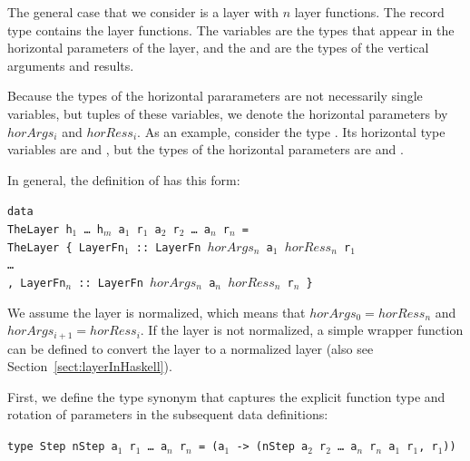 \documentclass[preprint,natbib]{sigplanconf}
\begin{document}


The general case that we consider is a layer with $n$ layer functions. The record type  contains the layer functions. The  variables are the types that appear in the horizontal parameters of the layer, and the  and  are the types of the vertical arguments and results. 

Because the types of the horizontal pararameters are not necessarily single  variables, but tuples of these variables, we denote the horizontal parameters by $horArgs_i$ and $horRess_i$. As an example, consider the type . Its horizontal  type variables are  and , but the types of the horizontal parameters are  and . 

In general, the definition of  has this form:
\
\begin{small}
\begin{tabbing}
{\tt da}\={\tt ta}\\
\> {\tt Th}\={\tt eLayer h$_1$ \dots ~h$_m$ a$_1$ r$_1$ a$_2$ r$_2$ \dots ~a$_n$ r$_n$ = }\\
\> \> {\tt TheLayer~}\={\tt \{~LayerFn$_1$}\verb| :: |{\tt LayerFn $horArgs_n$ a$_1$ $horRess_n$ r$_1$}\\
\>\>\> {\tt \dots }\\
\>\>\> {\tt , LayerFn$_n$}\verb| :: |{\tt LayerFn $horArgs_n$ a$_n$ $horRess_n$ r$_n$ \}}\\
\end{tabbing}
\end{small}

We assume the layer is normalized, which means that $horArgs_{0} = horRess_n$ and 
$horArgs_{i+1} = horRess_i$. If the layer is not normalized, a simple wrapper function can be defined to convert the layer to a normalized layer (also see Section~\ref{sect:layerInHaskell}).

\head{Type definitions}

\bc
First, we define the \p{Step} type synonym that captures the explicit function type and rotation of parameters in the subsequent data definitions:

\begin{small}
\begin{tabbing}
{\tt type St}\={\tt ep nStep a$_1$ r$_1$ \dots~a$_n$ r$_n$ = (a$_1$ -> (nStep a$_2$ r$_2$ \dots~a$_n$ r$_n$ a$_1$ r$_1$, r$_1$))}
\end{tabbing}
\end{small}
\end{document}

